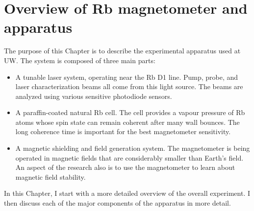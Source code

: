 \chapter{Overview of Rb magnetometer and apparatus}


The purpose of this Chapter is to describe the experimental apparatus
used at UW.  The system is composed of three main parts:
\begin{itemize}
\item A tunable laser system, operating near the Rb D1 line.  Pump,
  probe, and laser characterization beams all come from this light
  source.  The beams are analyzed using various sensitive photodiode
  sensors.
\item A paraffin-coated natural Rb cell.  The cell provides a vapour
  pressure of Rb atoms whose spin state can remain coherent after many
  wall bounces.  The long coherence time is important for the best
  magnetometer sensitivity.
\item A magnetic shielding and field generation system.  The
  magnetometer is being operated in magnetic fields that are
  considerably smaller than Earth's field.  An aspect of the research
  also is to use the magnetometer to learn about magnetic field
  stability.
\end{itemize}
In this Chapter, I start with a more detailed overview of the overall
experiment.  I then discuss each of the major components of the
apparatus in more detail.

